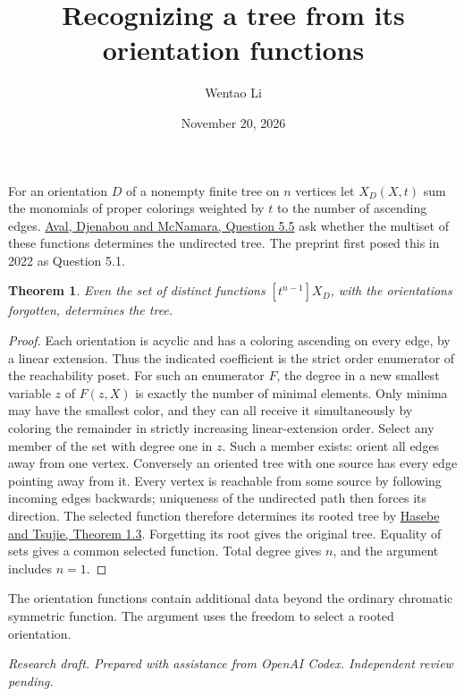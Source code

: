 \documentclass[11pt]{article}
\title{Recognizing a tree from its orientation functions}
\author{Wentao Li}
\date{November 20, 2026}
\newtheorem{theorem}{Theorem}
\begin{document}
\maketitle

For an orientation $D$ of a nonempty finite tree on $n$ vertices let $X_D(X,t)$ sum the monomials of proper colorings weighted by $t$ to the number of ascending edges. \href{https://doi.org/10.5802/alco.273}{Aval, Djenabou and McNamara, Question 5.5} ask whether the multiset of these functions determines the undirected tree. The preprint first posed this in 2022 as Question 5.1.
\begin{theorem}Even the set of distinct functions $[t^{n-1}]X_D$, with the orientations forgotten, determines the tree.\end{theorem}
\begin{proof}Each orientation is acyclic and has a coloring ascending on every edge, by a linear extension. Thus the indicated coefficient is the strict order enumerator of the reachability poset. For such an enumerator $F$, the degree in a new smallest variable $z$ of $F(z,X)$ is exactly the number of minimal elements. Only minima may have the smallest color, and they can all receive it simultaneously by coloring the remainder in strictly increasing linear-extension order. Select any member of the set with degree one in $z$. Such a member exists: orient all edges away from one vertex. Conversely an oriented tree with one source has every edge pointing away from it. Every vertex is reachable from some source by following incoming edges backwards; uniqueness of the undirected path then forces its direction.
The selected function therefore determines its rooted tree by \href{https://doi.org/10.1007/s10801-017-0761-7}{Hasebe and Tsujie, Theorem 1.3}. Forgetting its root gives the original tree. Equality of sets gives a common selected function. Total degree gives $n$, and the argument includes $n=1$.\end{proof}
The orientation functions contain additional data beyond the ordinary chromatic symmetric function. The argument uses the freedom to select a rooted orientation.

\medskip\noindent\textit{Research draft. Prepared with assistance from OpenAI Codex. Independent review pending.}
\end{document}

